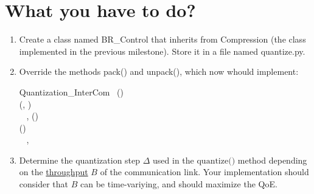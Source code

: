 \section{What you have to do?}

\begin{enumerate}
\item Create a class named BR\_Control that inherits from
  Compression (the class implemented in the previous
  milestone). Store it in a file named quantize.py.
  
\item Override the methods pack() and unpack(),
  which now whould implement:

\begin{pseudocode}{Quantization\_InterCom}{~}
  \BEGIN
     \GETS {}()\\
     \GETS {}(, )\\
    ~ 
  \END
  \ENDPROCEDURE
  \BEGIN
    ,  \GETS {}()\\
     \GETS {}()\\
    ~ , 
  \END
  \ENDPROCEDURE
\end{pseudocode}

\item Determine the quantization step $\Delta$ used in the
  $\text{quantize()}$ method depending on
  the \href{https://en.wikipedia.org/wiki/Throughput}{throughput} $B$
  of the communication link. Your implementation should consider that
  $B$ can be time-variying, and should maximize the QoE.

\end{enumerate}

